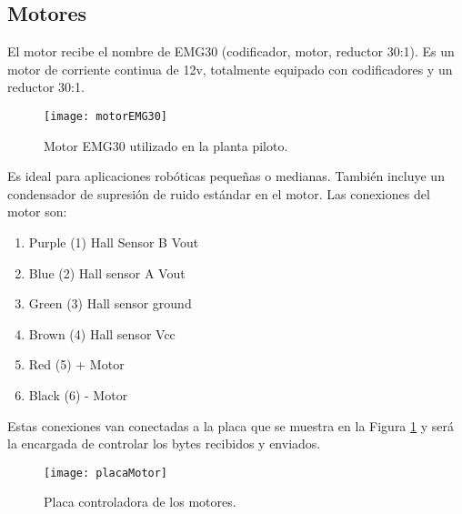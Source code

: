 \subsection{Motores} 

El motor recibe el nombre de EMG30 (codificador, motor, reductor 30:1). Es un motor de corriente continua de 12v, totalmente equipado con codificadores y un reductor 30:1. 

\begin{figure}[!h]
	\centering
	\texttt{[image: motorEMG30]}
	\caption{Motor EMG30 utilizado en la planta piloto.}
\end{figure}
\FloatBarrier

Es ideal para aplicaciones robóticas pequeñas o medianas. También incluye un condensador de supresión de ruido estándar en el motor. Las conexiones del motor son:

\begin{enumerate}
\item Purple (1) Hall Sensor B Vout
\item Blue (2) Hall sensor A Vout
\item Green (3) Hall sensor ground
\item Brown (4) Hall sensor Vcc
\item Red (5) + Motor
\item Black (6) - Motor
\end{enumerate}

Estas conexiones van conectadas a la placa que se muestra en la Figura \ref{controlMotor} y será la encargada de controlar los bytes recibidos y enviados.

\begin{figure}[!h]
	\centering
	\texttt{[image: placaMotor]}
	\caption{Placa controladora de los motores.}\label{controlMotor}
\end{figure}

